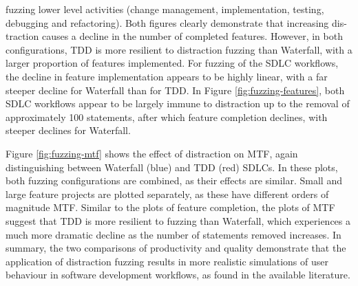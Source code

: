 \documentclass{llncs}
\begin{document}
fuzzing lower level activities (change management, implementation, testing, debugging and refactoring). Both figures
clearly demonstrate that increasing dis- traction causes a decline in the number of completed features. However, in both
configurations, TDD is more resilient to distraction fuzzing than Waterfall, with a larger proportion of features
implemented. For fuzzing of the SDLC workflows, the decline in feature implementation appears to be highly linear, with
a far steeper decline for Waterfall than for TDD. In Figure \ref{fig:fuzzing-features}, both SDLC workflows appear to be
largely immune to distraction up to the removal of approximately 100 statements, after which feature completion
declines, with steeper declines for Waterfall.

Figure \ref{fig:fuzzing-mtf} shows the effect of distraction on MTF, again distinguishing between Waterfall (blue) and
TDD (red) SDLCs.  In these plots, both fuzzing configurations are combined, as their effects are similar.  Small and
large feature projects are plotted separately, as these have different orders of magnitude MTF.  Similar to the plots
of feature completion, the plots of MTF suggest that TDD is more resilient to fuzzing than Waterfall, which experiences
a much more dramatic decline as the number of statements removed increases.  In summary, the two comparisons of
productivity and quality demonstrate that the application of distraction fuzzing results in more realistic simulations
of user behaviour in software development workflows, as found in the available literature.
\end{document}
